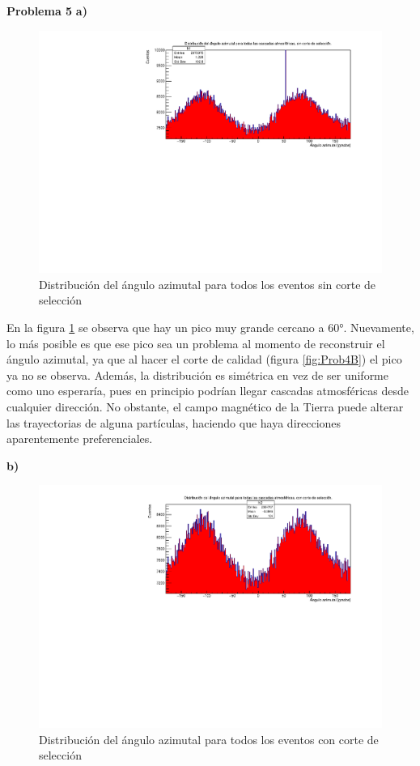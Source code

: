 \documentclass[11pt]{article}
\begin{document}
\textbf{Problema 5}
\textbf{a)}
\begin{figure}[H]
\centering
\includegraphics[width=1\textwidth]{../Figuras/Prob5A}
\caption{Distribución del ángulo azimutal para todos los eventos sin corte de selección}
\label{fig:Prob5A}
\end{figure}
En la figura \ref{fig:Prob5A} se observa que hay un pico muy grande cercano a 60°. Nuevamente, lo más posible es que ese pico sea un problema al momento de reconstruir el ángulo azimutal, ya que al hacer el corte de calidad (figura \ref{fig:Prob4B}) el pico ya no se observa. Además, la distribución es simétrica en vez de ser uniforme como uno esperaría, pues en principio podrían llegar cascadas atmosféricas desde cualquier dirección. No obstante, el campo magnético de la Tierra puede alterar las trayectorias de alguna partículas, haciendo que haya direcciones aparentemente preferenciales.

\textbf{b)}
\begin{figure}[H]
\centering
\includegraphics[width=1\textwidth]{../Figuras/Prob5B}
\caption{Distribución del ángulo azimutal para todos los eventos con corte de selección}
\label{fig:Prob5B}
\end{figure}
\end{document}
